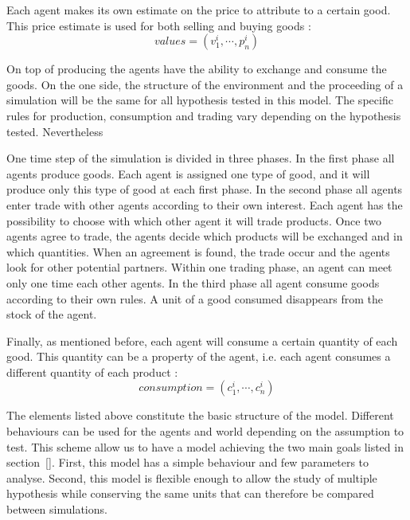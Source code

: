 \documentclass{wscpaperproc}
\begin{document}
Each agent makes its own estimate on the price to attribute to a certain good. This price estimate is used for both selling and buying goods :
$$ values = (v^i_1,\cdots,p^i_n) $$

On top of producing the agents have the ability to exchange and consume the goods. 
On the one side, the structure of the environment and the proceeding of a simulation will be the same for all hypothesis tested in this model. The specific rules for production, consumption and trading vary depending on the hypothesis tested. Nevertheless 

One time step of the simulation is divided in three phases. In the first phase all agents produce goods. Each agent is assigned one type of good, and it will produce only this type of good at each first phase. In the second phase all agents enter trade with other agents according to their own interest. Each agent has the possibility to choose with which other agent it will trade products. Once two agents agree to trade, the agents decide which products will be exchanged and in which quantities. When an agreement is found, the trade occur and the agents look for other potential partners. Within one trading phase, an agent can meet only one time each other agents. In the third phase all agent consume goods according to their own rules. A unit of a good consumed disappears from the stock of the agent.



 
Finally, as mentioned before, each agent will consume a certain quantity of each good. This quantity can be a property of the agent, i.e. each agent consumes a different quantity of each product :
$$ consumption = (c^i_1, \cdots, c^i_n) $$ 

The elements listed above constitute the basic structure of the model. Different behaviours can be used for the agents and world depending on the assumption to test. This scheme allow us to have a model achieving the two main goals listed in section~\ref{}. First, this model has a simple behaviour and few parameters to analyse. Second, this model is flexible enough to allow the study of multiple hypothesis while conserving the same units that can therefore be compared between simulations.
\end{document}
